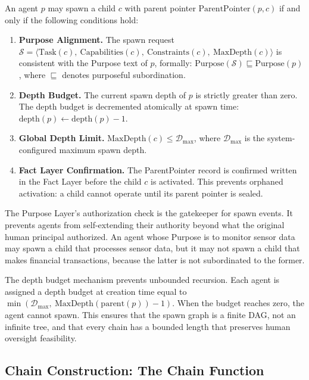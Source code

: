 \begin{definition}
\label{def:spawn-auth}
An agent $p$ may spawn a child $c$ with parent pointer $\mathrm{ParentPointer}(p, c)$ if and only if the following conditions hold:

\begin{enumerate}
  \item \textbf{Purpose Alignment.} The spawn request $\mathcal{S} = \langle \mathrm{Task}(c),\ \mathrm{Capabilities}(c),\ \mathrm{Constraints}(c),\ \mathrm{MaxDepth}(c) \rangle$ is consistent with the Purpose text of $p$, formally: $\mathrm{Purpose}(\mathcal{S}) \sqsubseteq \mathrm{Purpose}(p)$, where $\sqsubseteq$ denotes purposeful subordination.
  \item \textbf{Depth Budget.} The current spawn depth of $p$ is strictly greater than zero. The depth budget is decremented atomically at spawn time: $\mathrm{depth}(p) \leftarrow \mathrm{depth}(p) - 1$.
  \item \textbf{Global Depth Limit.} $\mathrm{MaxDepth}(c) \leq \mathcal{D}_{\max}$, where $\mathcal{D}_{\max}$ is the system-configured maximum spawn depth.
  \item \textbf{Fact Layer Confirmation.} The ParentPointer record is confirmed written in the Fact Layer before the child $c$ is activated. This prevents orphaned activation: a child cannot operate until its parent pointer is sealed.
\end{enumerate}
\end{definition}

The Purpose Layer's authorization check is the gatekeeper for spawn events. It prevents agents from self-extending their authority beyond what the original human principal authorized. An agent whose Purpose is to monitor sensor data may spawn a child that processes sensor data, but it may not spawn a child that makes financial transactions, because the latter is not subordinated to the former.

The depth budget mechanism prevents unbounded recursion. Each agent is assigned a depth budget at creation time equal to $\min(\mathcal{D}_{\max},\ \mathrm{MaxDepth}(\mathrm{parent}(p)) - 1)$. When the budget reaches zero, the agent cannot spawn. This ensures that the spawn graph is a finite DAG, not an infinite tree, and that every chain has a bounded length that preserves human oversight feasibility.

\subsection{Chain Construction: The Chain Function}

